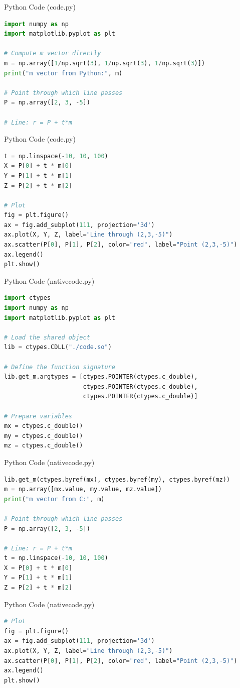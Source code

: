 \documentclass{beamer}
\begin{document}
\begin{frame}[fragile]{Python Code (code.py)}
\begin{lstlisting}[language=Python]
import numpy as np
import matplotlib.pyplot as plt

# Compute m vector directly
m = np.array([1/np.sqrt(3), 1/np.sqrt(3), 1/np.sqrt(3)])
print("m vector from Python:", m)

# Point through which line passes
P = np.array([2, 3, -5])

# Line: r = P + t*m

\end{lstlisting}
\end{frame}

\begin{frame}[fragile]{Python Code (code.py)}
\begin{lstlisting}[language=Python]
t = np.linspace(-10, 10, 100)
X = P[0] + t * m[0]
Y = P[1] + t * m[1]
Z = P[2] + t * m[2]

# Plot
fig = plt.figure()
ax = fig.add_subplot(111, projection='3d')
ax.plot(X, Y, Z, label="Line through (2,3,-5)")
ax.scatter(P[0], P[1], P[2], color="red", label="Point (2,3,-5)")
ax.legend()
plt.show()
\end{lstlisting}
\end{frame}


\begin{frame}[fragile]{Python Code (nativecode.py)}
\begin{lstlisting}[language=Python]
import ctypes
import numpy as np
import matplotlib.pyplot as plt

# Load the shared object
lib = ctypes.CDLL("./code.so")

# Define the function signature
lib.get_m.argtypes = [ctypes.POINTER(ctypes.c_double),
                      ctypes.POINTER(ctypes.c_double),
                      ctypes.POINTER(ctypes.c_double)]

# Prepare variables
mx = ctypes.c_double()
my = ctypes.c_double()
mz = ctypes.c_double()
\end{lstlisting}
\end{frame}
\begin{frame}[fragile]{Python Code (nativecode.py)}
\begin{lstlisting}[language=Python]
lib.get_m(ctypes.byref(mx), ctypes.byref(my), ctypes.byref(mz))
m = np.array([mx.value, my.value, mz.value])
print("m vector from C:", m)

# Point through which line passes
P = np.array([2, 3, -5])

# Line: r = P + t*m
t = np.linspace(-10, 10, 100)
X = P[0] + t * m[0]
Y = P[1] + t * m[1]
Z = P[2] + t * m[2]
\end{lstlisting}
\end{frame}
\begin{frame}[fragile]{Python Code (nativecode.py)}
\begin{lstlisting}[language=Python]
# Plot
fig = plt.figure()
ax = fig.add_subplot(111, projection='3d')
ax.plot(X, Y, Z, label="Line through (2,3,-5)")
ax.scatter(P[0], P[1], P[2], color="red", label="Point (2,3,-5)")
ax.legend()
plt.show()
\end{lstlisting}
\end{frame}
\end{document}
